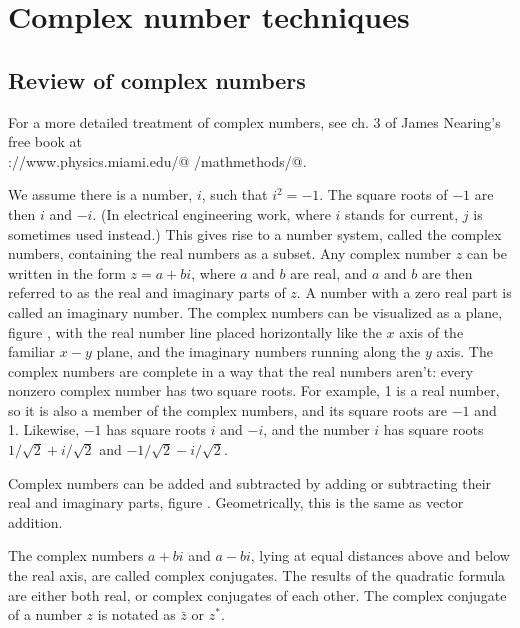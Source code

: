 \chapter{Complex number techniques}\label{ch:complex}

\section{Review of complex numbers}

For a more detailed treatment of complex numbers, see ch. 3 of
James Nearing's free book at \\
\verb@http://www.physics.miami.edu/@
\verb@nearing/mathmethods/@.
%
%
%

We assume there is a number, $i$, such that $i^2=-1$.
The square roots of $-1$ are then $i$ and $-i$. (In electrical engineering work,
where $i$ stands for current, $j$ is sometimes used instead.) This gives rise
to a number system, called the complex numbers, containing the real numbers as a subset.
Any complex number $z$ can be written in the form $z=a+bi$, where $a$ and $b$ are
real, and $a$ and $b$ are then referred to as the real and imaginary parts of $z$.
A number with a zero real part is called an imaginary number.
The complex numbers can be visualized as a plane, figure , with the real number line placed
horizontally like the $x$ axis of the familiar $x-y$ plane, and the imaginary numbers running
along the $y$ axis. The complex numbers are complete in a way that the real numbers
aren't: every nonzero complex number has two square roots. For example, 1 is
a real number, so it is also a member of the complex numbers, and its square roots
are $-1$ and 1. Likewise, $-1$ has square roots $i$ and $-i$, and the number $i$
has square roots $1/\sqrt{2}+i/\sqrt{2}$ and $-1/\sqrt{2}-i/\sqrt{2}$.

Complex numbers can be added and subtracted by adding or subtracting their real
and imaginary parts, figure . Geometrically, this is the same as vector addition.

The complex numbers $a+bi$ and $a-bi$, lying at equal distances above and below the
real axis, are called complex conjugates.
The results of the quadratic formula
are either both real, or complex conjugates of each other.
The complex conjugate of a number $z$ is notated as $\bar{z}$ or
$z^*$.

